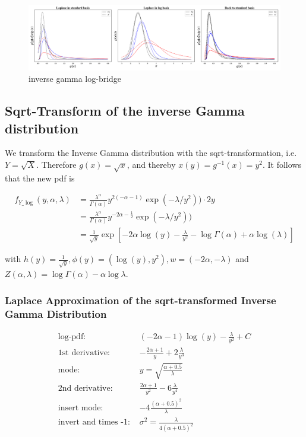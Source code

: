 \begin{figure}[!htb]
	\centering
	\includegraphics[width=\textwidth]{figures/inverse_gamma_log_bridge.pdf}
	\caption{inverse gamma log-bridge}
	\label{fig:inverse_gamma_log_bridge}
\end{figure}

\subsection{Sqrt-Transform of the inverse Gamma distribution}

We transform the Inverse Gamma distribution with the sqrt-transformation, i.e. $Y = \sqrt{X}$. Therefore $g(x) = \sqrt{x}$, and thereby $x(y) = g^{-1}(x) = y^2$. It follows that the new pdf is 

\begin{subequations}
\begin{align}
f_{Y\_\log}(y, \alpha, \lambda) &= \frac{\lambda^{\alpha}}{\Gamma(\alpha)} y^{2(-\alpha-1)} \exp(-\lambda/y^2)) \cdot 2y \\
&=  \frac{\lambda^{\alpha}}{\Gamma(\alpha)} y^{-2\alpha-\frac{1}{2}} \exp(-\lambda/y^2)) \\
&= \frac{1}{\sqrt{y}}\exp\left[-2\alpha \log(y) - \frac{\lambda}{y^2} - \log\Gamma(\alpha) + \alpha\log(\lambda)\right]
\label{eq:inv_gamma_sqrt_pdf}
\end{align}
\end{subequations}


with $h(y) = \frac{1}{\sqrt{y}}, \phi(y) = (\log(y), y^2), w=(-2\alpha, -\lambda)$ and $Z(\alpha, \lambda) = \log\Gamma(\alpha) - \alpha \log \lambda$.

\subsubsection{Laplace Approximation of the sqrt-transformed Inverse Gamma Distribution}

\begin{align*}
\text{log-pdf: } &(-2\alpha-1)\log(y) - \frac{\lambda}{y^2} + C \\
\text{1st derivative: }& -\frac{2\alpha+1}{y} + 2\frac{\lambda}{y^3} \\
\text{mode: }&  y = \sqrt{\frac{\alpha+0.5}{\lambda}}\\
\text{2nd derivative: }&  \frac{2\alpha+1}{y^2} - 6\frac{\lambda}{y^4}\\
\text{insert mode: }&  -4\frac{(\alpha+0.5)^2}{\lambda}\\
\text{invert and times -1: }&\sigma^2 = \frac{\lambda}{4 (\alpha+0.5)^2}
\end{align*}


